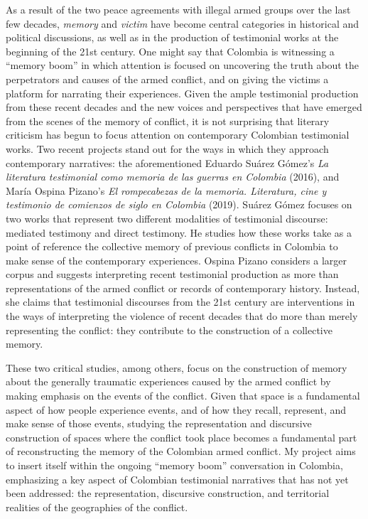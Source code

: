 \documentclass[
  11pt,
,
onecolumn,
openany
]{book}
\begin{document}
As a result of the two peace agreements with illegal armed groups over the
last few decades, \emph{memory} and \emph{victim} have become central
categories in historical and political discussions, as well as in the
production of testimonial works at the beginning of the 21st century. One
might say that Colombia is witnessing a ``memory boom'' in which attention is
focused on uncovering the truth about the perpetrators and causes of the armed
conflict, and on giving the victims a platform for narrating their
experiences. Given the ample testimonial production from these recent decades
and the new voices and perspectives that have emerged from the scenes of the
memory of conflict, it is not surprising that literary criticism has begun to
focus attention on contemporary Colombian testimonial works. Two recent
projects stand out for the ways in which they approach contemporary
narratives: the aforementioned Eduardo Suárez Gómez's \emph{La literatura
testimonial como memoria de las guerras en Colombia} (2016), and María Ospina
Pizano's \emph{El rompecabezas de la memoria. Literatura, cine y testimonio de
comienzos de siglo en Colombia} (2019). Suárez Gómez focuses on two works that
represent two different modalities of testimonial discourse: mediated
testimony and direct testimony. He studies how these works take as a point of
reference the collective memory of previous conflicts in Colombia to make
sense of the contemporary experiences. Ospina Pizano considers a larger corpus
and suggests interpreting recent testimonial production as more than
representations of the armed conflict or records of contemporary history.
Instead, she claims that testimonial discourses from the 21st century are
interventions in the ways of interpreting the violence of recent decades that
do more than merely representing the conflict: they contribute to the
construction of a collective memory.

These two critical studies, among others, focus on the construction of memory
about the generally traumatic experiences caused by the armed conflict by
making emphasis on the events of the conflict. Given that space is a
fundamental aspect of how people experience events, and of how they recall,
represent, and make sense of those events, studying the representation and
discursive construction of spaces where the conflict took place becomes a
fundamental part of reconstructing the memory of the Colombian armed conflict.
My project aims to insert itself within the ongoing ``memory boom''
conversation in Colombia, emphasizing a key aspect of Colombian testimonial
narratives that has not yet been addressed: the representation, discursive
construction, and territorial realities of the geographies of the conflict.
\end{document}
